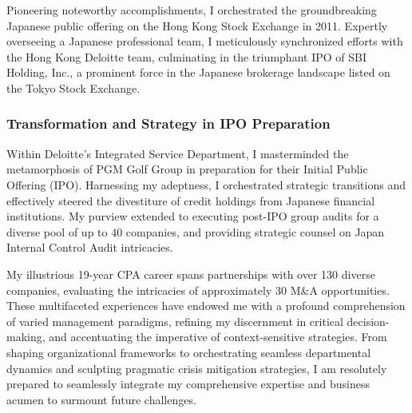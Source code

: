 Pioneering noteworthy accomplishments, I orchestrated the groundbreaking Japanese public offering on the Hong Kong Stock Exchange in 2011. Expertly overseeing a Japanese professional team, I meticulously synchronized efforts with the Hong Kong Deloitte team, culminating in the triumphant IPO of SBI Holding, Inc., a prominent force in the Japanese brokerage landscape listed on the Tokyo Stock Exchange.

\subsubsection{Transformation and Strategy in IPO Preparation}

Within Deloitte's Integrated Service Department, I masterminded the metamorphosis of PGM Golf Group in preparation for their Initial Public Offering (IPO). Harnessing my adeptness, I orchestrated strategic transitions and effectively steered the divestiture of credit holdings from Japanese financial institutions. My purview extended to executing post-IPO group audits for a diverse pool of up to 40 companies, and providing strategic counsel on Japan Internal Control Audit intricacies.

My illustrious 19-year CPA career spans partnerships with over 130 diverse companies, evaluating the intricacies of approximately 30 M\&A opportunities. These multifaceted experiences have endowed me with a profound comprehension of varied management paradigms, refining my discernment in critical decision-making, and accentuating the imperative of context-sensitive strategies. From shaping organizational frameworks to orchestrating seamless departmental dynamics and sculpting pragmatic crisis mitigation strategies, I am resolutely prepared to seamlessly integrate my comprehensive expertise and business acumen to surmount future challenges.




